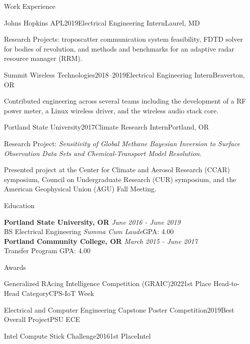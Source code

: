 \documentclass{resume}
\begin{document}
\begin{rSection}{Work Experience}
\begin{rSubsection}{Johns Hopkins APL}{2019}{Electrical Engineering Intern}{Laurel, MD}
\item Research Projects: troposcatter communication system feasibility, FDTD solver for bodies of revolution, and methods and benchmarks for an adaptive radar resource manager (RRM).
\end{rSubsection}

\begin{rSubsection}{Summit Wireless Technologies}{2018--2019}{Electrical Engineering Intern}{Beaverton, OR}
\item Contributed engineering across several teams including the development of a RF power meter, a Linux wireless driver, and the wireless audio stack core. 
\end{rSubsection}

\begin{rSubsection}{Portland State University}{2017}{Climate Research Intern}{Portland, OR}
\item Research Project: \textit{Sensitivity of Global Methane Bayesian Inversion to Surface Observation Data Sets and Chemical-Transport Model Resolution}.
\item Presented project at the Center for Climate and Aerosol Research (CCAR) symposium,
Council on Undergraduate Research (CUR) symposium, and the American Geophysical
Union (AGU) Fall Meeting.
\end{rSubsection}
\end{rSection}

\newpage

\begin{rSection}{Education}

{\bf Portland State University, OR} \hfill {\em June 2016 - June 2019} 
\\ BS Electrical Engineering \quad \textit{Summa Cum Laude}\hfill {GPA: 4.00}
\\{\bf Portland Community College, OR} \hfill {\em March 2015 - June 2017} 
\\ Transfer Program \hfill {GPA: 4.00}

\end{rSection}

\begin{rSection}{Awards}
\begin{rSubsectionEmpty}{Generalized RAcing Intelligence Competition (GRAIC)}{2022}{1st Place Head-to-Head Category}{CPS-IoT Week}\end{rSubsectionEmpty}

\begin{rSubsectionEmpty}{Electrical and Computer Engineering Capstone Poster Competition}{2019}{Best Overall Project}{PSU ECE}\end{rSubsectionEmpty}

\begin{rSubsectionEmpty}{Intel Compute Stick Challenge}{2016}{1st Place}{Intel}\end{rSubsectionEmpty}
\end{rSection}
\end{document}
